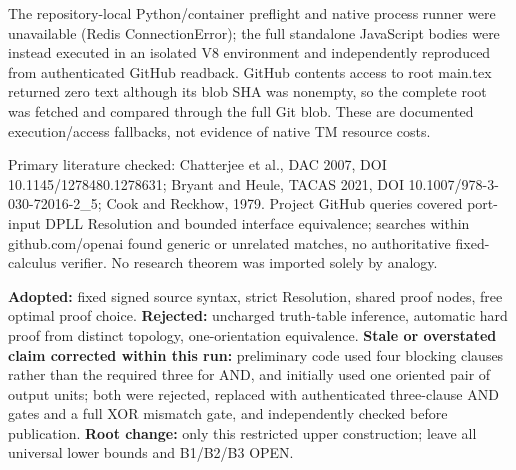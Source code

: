 \documentclass[11pt]{article}
\begin{document}
The repository-local Python/container preflight and native process runner were unavailable (Redis ConnectionError); the full standalone JavaScript bodies were instead executed in an isolated V8 environment and independently reproduced from authenticated GitHub readback. GitHub contents access to root main.tex returned zero text although its blob SHA was nonempty, so the complete root was fetched and compared through the full Git blob. These are documented execution/access fallbacks, not evidence of native TM resource costs.

Primary literature checked: Chatterjee et al., DAC 2007, DOI 10.1145/1278480.1278631; Bryant and Heule, TACAS 2021, DOI 10.1007/978-3-030-72016-2\_5; Cook and Reckhow, 1979. Project GitHub queries covered port-input DPLL Resolution and bounded interface equivalence; searches within github.com/openai found generic or unrelated matches, no authoritative fixed-calculus verifier. No research theorem was imported solely by analogy.

\textbf{Adopted:} fixed signed source syntax, strict Resolution, shared proof nodes, free optimal proof choice. \textbf{Rejected:} uncharged truth-table inference, automatic hard proof from distinct topology, one-orientation equivalence. \textbf{Stale or overstated claim corrected within this run:} preliminary code used four blocking clauses rather than the required three for AND, and initially used one oriented pair of output units; both were rejected, replaced with authenticated three-clause AND gates and a full XOR mismatch gate, and independently checked before publication. \textbf{Root change:} only this restricted upper construction; leave all universal lower bounds and B1/B2/B3 OPEN.
\end{document}
